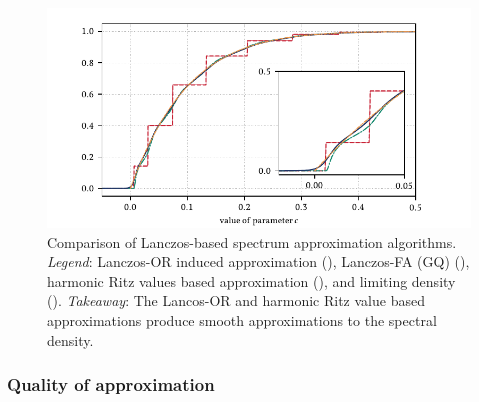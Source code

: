 \begin{figure}[ht]
    \begin{center}
        \includegraphics{imgs/ch6_sign_spec.pdf} 
    \end{center}
    \caption[{Comparison of Lanczos-based spectrum approximation algorithms.}]{%
    Comparison of Lanczos-based spectrum approximation algorithms.
    \hspace{.25em}\textit{Legend}:
    Lanczos-OR induced approximation
    ({\protect{}}), 
    Lanczos-FA (GQ) ({\protect{}}),
    harmonic Ritz values based approximation
    ({\protect{}}), and
    limiting density
    ({\protect{}}).
    \hspace{.25em}\emph{Takeaway}: The Lancos-OR and harmonic Ritz value based approximations produce smooth approximations to the spectral density.
    }
    \label{fig:ch6_sign_spec}
\end{figure}

\subsubsection{Quality of approximation}


